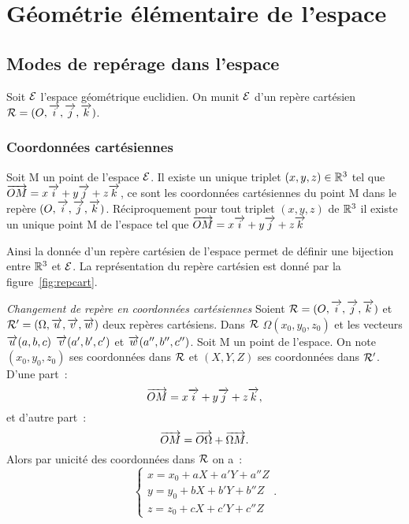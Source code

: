 \chapter{Géométrie élémentaire de l'espace}
\label{chap:geomEspace}
\minitoc
\minilof
\minilot
\section{Modes de repérage dans l'espace}
Soit \(\mathcal{E}\) l'espace géométrique euclidien. On munit \(\mathcal{E}\) d'un repère cartésien \(\mathcal{R}=(O,\overrightarrow{i},\overrightarrow{j},\overrightarrow{k})\).

\subsection{Coordonnées cartésiennes}
\begin{defdef}
  Soit M un point de l'espace \(\mathcal{E}\). Il existe un unique triplet \((x,y,z)\in\mathbb{R}^3\) tel que \(\overrightarrow{OM}=x\overrightarrow{i}+y\overrightarrow{j}+z\overrightarrow{k}\), ce sont les coordonnées cartésiennes du point M dans le repère \((O,\overrightarrow{i},\overrightarrow{j},\overrightarrow{k})\). Réciproquement pour tout triplet \((x,y,z)\) de \(\mathbb{R}^3\) il existe un unique point M de l'espace tel que \(\overrightarrow{OM}=x\overrightarrow{i}+y\overrightarrow{j}+z\overrightarrow{k}\)
\end{defdef}
Ainsi la donnée d'un repère cartésien de l'espace permet de définir une bijection entre \(\mathbb{R}^3\) et \(\mathcal{E}\). La représentation du repère cartésien est donné par la figure~\ref{fig:repcart}.

\emph{Changement de repère en coordonnées cartésiennes}
Soient \(\mathcal{R}=(O,\overrightarrow{i},\overrightarrow{j},\overrightarrow{k})\) et \(\mathcal{R}'=(\Omega,\overrightarrow{u},\overrightarrow{v},\overrightarrow{w})\) deux repères cartésiens. Dans \(\mathcal{R}\) \(\Omega(x_0,y_0,z_0)\) et les vecteurs \(\overrightarrow{u}(a,b,c)\) \(\overrightarrow{v}(a',b',c')\) et \(\overrightarrow{w}(a'',b'',c'')\). Soit M un point de l'espace. On note \((x_0,y_0,z_0)\) ses coordonnées dans \(\mathcal{R}\) et \((X,Y,Z)\) ses coordonnées dans \(\mathcal{R}'\). D'une part~:
\begin{equation}
  \overrightarrow{OM}=x\overrightarrow{i}+y\overrightarrow{j}+z\overrightarrow{k},
\end{equation}
et d'autre part~:
\begin{equation}
  \overrightarrow{OM}=\overrightarrow{O\Omega}+\overrightarrow{\Omega M}.
\end{equation}
Alors par unicité des coordonnées dans \(\mathcal{R}\) on a~:
\begin{equation}
  \begin{cases}
    x=x_0+aX+a'Y+a''Z\\
    y=y_0+bX+b'Y+b''Z\\
    z=z_0+cX+c'Y+c''Z
  \end{cases}.
\end{equation}


